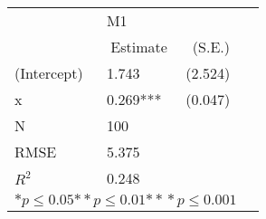 \begin{tabular}{@{}l*{3}{l}@{}}
\hline
  &\multicolumn{2}{l}{M1  }\tabularnewline
 &\multicolumn{1}{c}{Estimate}&\multicolumn{1}{c}{(S.E.)}\tabularnewline
 \hline
 \hline
  (Intercept) & 1.743 & (2.524) \tabularnewline
  x & 0.269*** & (0.047) \tabularnewline
 \hline
 N&\multicolumn{1}{l}{100}  & \tabularnewline
 RMSE&5.375\tabularnewline
 $R^2$&0.248\tabularnewline
 \hline
\hline
 
 \multicolumn{3}{l}{  ${*  p}\le 0.05$${*\!\!*  p}\le 0.01$${*\!\!*\!\!*  p}\le 0.001$}\tabularnewline
 \end{tabular}